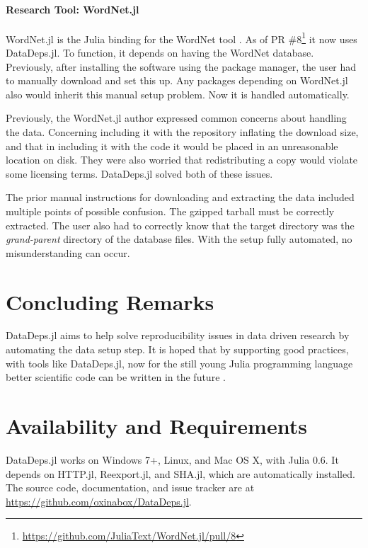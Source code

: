\documentclass[twoside,11pt]{article}
\begin{document}
\paragraph{Research Tool: WordNet.jl}\label{sec:research-tool-wordnetjl}
WordNet.jl is the Julia binding for the WordNet tool \citep{miller1995wordnet}.
As of PR \#8\footnote{\url{https://github.com/JuliaText/WordNet.jl/pull/8}} it now uses DataDeps.jl.
To function, it depends on having the WordNet database.
Previously, after installing the software using the package manager,
the user had to manually download and set this up.
Any packages depending on WordNet.jl also would inherit this manual setup problem.
Now it is handled automatically.

Previously, the WordNet.jl author expressed common concerns about handling the data.
Concerning including it with the repository inflating the download size, and that in including it with the code it would be placed in an unreasonable location on disk.
They were also worried that redistributing a copy would violate some licensing terms.
DataDeps.jl solved both of these issues.

The prior manual instructions for downloading and extracting the data included multiple points of possible confusion.
The gzipped tarball must be correctly extracted.
The user also had to correctly know that the target directory was the \emph{grand-parent} directory of the database files.
With the setup fully automated, no misunderstanding can occur.


\section {Concluding Remarks}
DataDeps.jl aims to help solve reproducibility issues in data driven research by automating the data setup step.
It is hoped that by supporting good practices, with tools like DataDeps.jl, now for the still young Julia programming language
better scientific code can be written in the future .


\section{Availability and Requirements}
DataDeps.jl works on  Windows 7+, Linux, and Mac OS X, with Julia 0.6.
It depends on HTTP.jl, Reexport.jl, and SHA.jl, which are automatically installed.
The source code, documentation, and issue tracker are at \url{https://github.com/oxinabox/DataDeps.jl}.

\newpage

\end{document}
